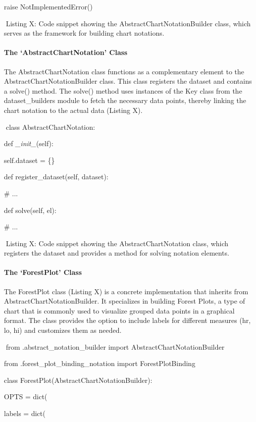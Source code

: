 \documentclass[
]{article}
\begin{document}
raise NotImplementedError()

Listing X: Code snippet showing the AbstractChartNotationBuilder class,
which serves as the framework for building chart notations.

\paragraph{The `AbstractChartNotation'
Class}\label{the-abstractchartnotation-class}

The AbstractChartNotation class functions as a complementary element to
the AbstractChartNotationBuilder class. This class registers the dataset
and contains a solve() method. The solve() method uses instances of the
Key class from the dataset\_builders module to fetch the necessary data
points, thereby linking the chart notation to the actual data (Listing
X).

class AbstractChartNotation:

def \emph{\_init\_}(self):

self.dataset = \{\}

def register\_dataset(self, dataset):

\# ...

def solve(self, el):

\# ...

Listing X: Code snippet showing the AbstractChartNotation class, which
registers the dataset and provides a method for solving notation
elements.

\paragraph{The `ForestPlot' Class}\label{the-forestplot-class}

The ForestPlot class (Listing X) is a concrete implementation that
inherits from AbstractChartNotationBuilder. It specializes in building
Forest Plots, a type of chart that is commonly used to visualize grouped
data points in a graphical format. The class provides the option to
include labels for different measures (hr, lo, hi) and customizes them
as needed.

from .abstract\_notation\_builder import AbstractChartNotationBuilder

from .forest\_plot\_binding\_notation import ForestPlotBinding

class ForestPlot(AbstractChartNotationBuilder):

OPTS = dict(

labels = dict(
\end{document}
